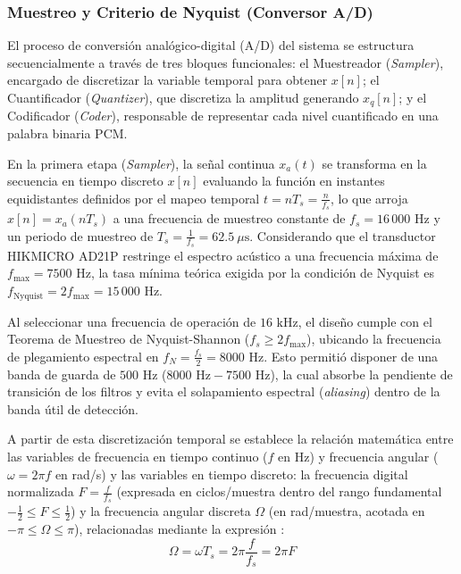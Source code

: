 \documentclass[11pt, a4paper]{article}
\begin{document}
\subsubsection{Muestreo y Criterio de Nyquist (Conversor A/D)}
El proceso de conversión analógico-digital (A/D) del sistema se estructura secuencialmente a través de tres bloques funcionales: el Muestreador (\textit{Sampler}), encargado de discretizar la variable temporal para obtener $x[n]$; el Cuantificador (\textit{Quantizer}), que discretiza la amplitud generando $x_q[n]$; y el Codificador (\textit{Coder}), responsable de representar cada nivel cuantificado en una palabra binaria PCM.

En la primera etapa (\textit{Sampler}), la señal continua $x_a(t)$ se transforma en la secuencia en tiempo discreto $x[n]$ evaluando la función en instantes equidistantes definidos por el mapeo temporal $t = n T_s = \frac{n}{f_s}$, lo que arroja $x[n] = x_a(n T_s)$ a una frecuencia de muestreo constante de $f_s = 16\,000 \text{ Hz}$ y un periodo de muestreo de $T_s = \frac{1}{f_s} = 62.5\ \mu\text{s}$. Considerando que el transductor HIKMICRO AD21P restringe el espectro acústico a una frecuencia máxima de $f_{\max} = 7500 \text{ Hz}$, la tasa mínima teórica exigida por la condición de Nyquist es $f_{\text{Nyquist}} = 2 f_{\max} = 15\,000 \text{ Hz}$.

Al seleccionar una frecuencia de operación de $16 \text{ kHz}$, el diseño cumple con el Teorema de Muestreo de Nyquist-Shannon ($f_s \ge 2 f_{\max}$), ubicando la frecuencia de plegamiento espectral en $f_N = \frac{f_s}{2} = 8000 \text{ Hz}$. Esto permitió disponer de una banda de guarda de $500 \text{ Hz}$ ($8000 \text{ Hz} - 7500 \text{ Hz}$), la cual absorbe la pendiente de transición de los filtros y evita el solapamiento espectral (\textit{aliasing}) dentro de la banda útil de detección.

A partir de esta discretización temporal se establece la relación matemática entre las variables de frecuencia en tiempo continuo ($f$ en Hz) y frecuencia angular ($\omega = 2\pi f$ en rad/s) y las variables en tiempo discreto: la frecuencia digital normalizada $F = \frac{f}{f_s}$ (expresada en ciclos/muestra dentro del rango fundamental $-\frac{1}{2} \le F \le \frac{1}{2}$) y la frecuencia angular discreta $\Omega$ (en rad/muestra, acotada en $-\pi \le \Omega \le \pi$), relacionadas mediante la expresión \cite{Proakis}:
\begin{equation}
    \Omega = \omega T_s = 2\pi \frac{f}{f_s} = 2\pi F
\end{equation}
\end{document}
